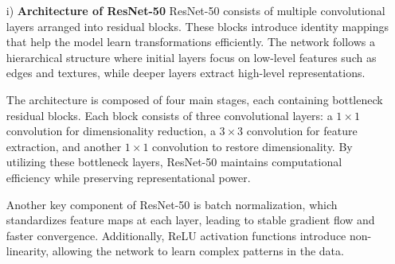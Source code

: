       \begin{itemize}
            \item[i)] \textbf{Architecture of ResNet-50} 
            ResNet-50 consists of multiple convolutional layers arranged into residual blocks. These blocks introduce identity mappings that help the model learn transformations efficiently. The network follows a hierarchical structure where initial layers focus on low-level features such as edges and textures, while deeper layers extract high-level representations.

            The architecture is composed of four main stages, each containing bottleneck residual blocks. Each block consists of three convolutional layers: a \(1\times1\) convolution for dimensionality reduction, a \(3\times3\) convolution for feature extraction, and another \(1\times1\) convolution to restore dimensionality. By utilizing these bottleneck layers, ResNet-50 maintains computational efficiency while preserving representational power.

            Another key component of ResNet-50 is batch normalization, which standardizes feature maps at each layer, leading to stable gradient flow and faster convergence. Additionally, ReLU activation functions introduce non-linearity, allowing the network to learn complex patterns in the data.


\end{itemize}
